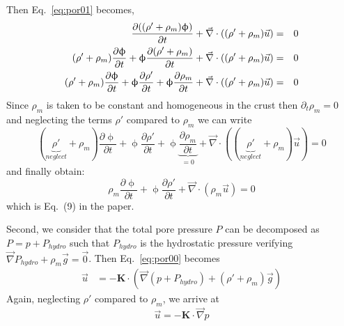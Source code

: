 Then Eq.~\eqref{eq:por01} becomes,
\begin{eqnarray}
\frac{\partial ((\rho'+\rho_m) \upphi)}{\partial t} + \vec\nabla\cdot ((\rho'+\rho_m) \vec{u}) &=& 0 
\nonumber\\
(\rho'+\rho_m) \frac{\partial \upphi}{\partial t} 
+\upphi \frac{\partial (\rho'+\rho_m)}{\partial t} 
+ \vec\nabla\cdot ((\rho'+\rho_m) \vec{u}) &=& 0
\nonumber\\
(\rho' + \rho_m) \frac{\partial \upphi}{\partial t} 
+\upphi \frac{\partial \rho'}{\partial t} 
+\upphi \frac{\partial \rho_m}{\partial t} 
+ \vec\nabla\cdot ((\rho'+\rho_m) \vec{u}) 
&=& 0 \nonumber
\end{eqnarray}
Since $\rho_m$ is taken to be constant and homogeneous in the crust
then $\partial_t \rho_m =0$ %
and neglecting the terms $\rho'$ compared to $\rho_m$ we can write
\begin{equation}
(\underbrace{\rho' }_{neglect} + \rho_m )\frac{\partial \upphi}{\partial t} 
+\upphi \frac{\partial \rho'}{\partial t} 
+\upphi \underbrace{\frac{\partial \rho_m}{\partial t} }_{=0}
+ \vec\nabla\cdot ((\underbrace{\rho'}_{neglect}+\rho_m) \vec{u}) = 0
\end{equation}
and finally obtain:
\begin{equation}
\boxed{
\rho_m \frac{\partial \upphi}{\partial t} 
+\upphi \frac{\partial \rho' }{\partial t} 
+ \vec\nabla\cdot (\rho_m \vec{u}) = 0
}
\label{eq:por10}
\end{equation}
which is Eq.~(9) in the paper.

Second, we consider that the total pore pressure $P$ can
be decomposed as $P = p + P_{hydro}$ such that $P_{hydro}$ is the
hydrostatic pressure verifying $\vec\nabla P_{hydro} + \rho_m \vec{g} = \vec{0}$. 
Then Eq.~\eqref{eq:por00} becomes
\begin{align}
\vec{u} &= -{\bm K} \cdot (\vec{\nabla} (p + P_{hydro}) + (\rho'+\rho_m) \vec{g}) 
\end{align}
Again, neglecting $\rho'$ compared to $\rho_m$, we arrive at
\begin{equation}
\boxed{
\vec{u} = -{\bm K} \cdot \vec{\nabla} p  
}
\label{eq:por21}
\end{equation}

